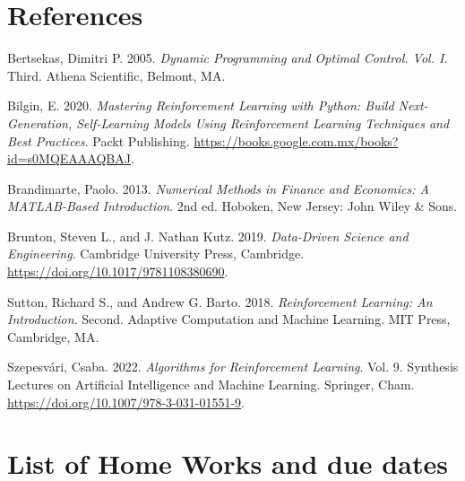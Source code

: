 \documentclass[
  letterpaper,
  DIV=11,
  numbers=noendperiod]{scrreprt}
\newlength{\cslhangindent}
\newenvironment{CSLReferences}[2] %
 {\begin{list}{}{%
  \setlength{\itemindent}{0pt}
  \setlength{\leftmargin}{0pt}
  \setlength{\parsep}{0pt}
  \ifodd #1
   \setlength{\leftmargin}{\cslhangindent}
   \setlength{\itemindent}{-1\cslhangindent}
  \fi
  \setlength{\itemsep}{#2\baselineskip}}}
 {\end{list}}
\theoremstyle{definition}
\theoremstyle{remark}
\begin{document}

\chapter*{References}\label{references}


\label{refs}
\begin{CSLReferences}{1}{0}
Bertsekas, Dimitri P. 2005. \emph{Dynamic Programming and Optimal
Control. {V}ol. {I}}. Third. Athena Scientific, Belmont, MA.

Bilgin, E. 2020. \emph{Mastering Reinforcement Learning with Python:
Build Next-Generation, Self-Learning Models Using Reinforcement Learning
Techniques and Best Practices}. Packt Publishing.
\url{https://books.google.com.mx/books?id=s0MQEAAAQBAJ}.

Brandimarte, Paolo. 2013. \emph{Numerical Methods in Finance and
Economics: A MATLAB-Based Introduction}. 2nd ed. Hoboken, New Jersey:
John Wiley \& Sons.

Brunton, Steven L., and J. Nathan Kutz. 2019. \emph{Data-Driven Science
and Engineering}. Cambridge University Press, Cambridge.
\url{https://doi.org/10.1017/9781108380690}.

Sutton, Richard S., and Andrew G. Barto. 2018. \emph{Reinforcement
Learning: An Introduction}. Second. Adaptive Computation and Machine
Learning. MIT Press, Cambridge, MA.

Szepesvári, Csaba. 2022. \emph{Algorithms for Reinforcement Learning}.
Vol. 9. Synthesis Lectures on Artificial Intelligence and Machine
Learning. Springer, Cham.
\url{https://doi.org/10.1007/978-3-031-01551-9}.

\end{CSLReferences}


\chapter*{List of Home Works and due
dates}\label{list-of-home-works-and-due-dates}
\end{document}
